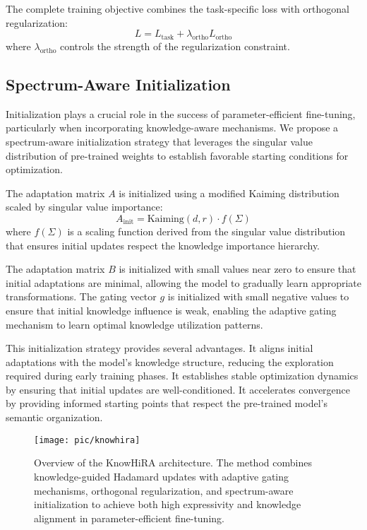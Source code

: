 \documentclass[10pt,letterpaper]{article}
\begin{document}
The complete training objective combines the task-specific loss with orthogonal regularization:
\begin{equation}
L = L_{\text{task}} + \lambda_{\text{ortho}} L_{\text{ortho}}
\end{equation}
where $\lambda_{\text{ortho}}$ controls the strength of the regularization constraint.

\subsection{Spectrum-Aware Initialization}

Initialization plays a crucial role in the success of parameter-efficient fine-tuning, particularly when incorporating knowledge-aware mechanisms. We propose a spectrum-aware initialization strategy that leverages the singular value distribution of pre-trained weights to establish favorable starting conditions for optimization.

The adaptation matrix $A$ is initialized using a modified Kaiming distribution scaled by singular value importance:
\begin{equation}
A_{\text{init}} = \text{Kaiming}(d,r) \cdot f(\Sigma)
\end{equation}
where $f(\Sigma)$ is a scaling function derived from the singular value distribution that ensures initial updates respect the knowledge importance hierarchy.

The adaptation matrix $B$ is initialized with small values near zero to ensure that initial adaptations are minimal, allowing the model to gradually learn appropriate transformations. The gating vector $g$ is initialized with small negative values to ensure that initial knowledge influence is weak, enabling the adaptive gating mechanism to learn optimal knowledge utilization patterns.

This initialization strategy provides several advantages. It aligns initial adaptations with the model's knowledge structure, reducing the exploration required during early training phases. It establishes stable optimization dynamics by ensuring that initial updates are well-conditioned. It accelerates convergence by providing informed starting points that respect the pre-trained model's semantic organization.

\begin{figure}[!htbp]
    \centering
    \texttt{[image: pic/knowhira]}
    \caption{Overview of the KnowHiRA architecture. The method combines knowledge-guided Hadamard updates with adaptive gating mechanisms, orthogonal regularization, and spectrum-aware initialization to achieve both high expressivity and knowledge alignment in parameter-efficient fine-tuning.}
    \label{fig:knowhira_architecture}
\end{figure}
\end{document}
